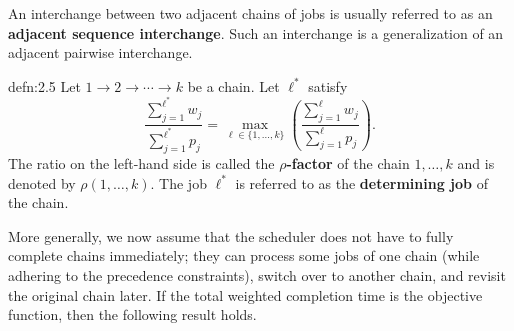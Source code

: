 An interchange between two adjacent chains of jobs is usually referred to as
an {\bf adjacent sequence interchange}. Such an interchange is a generalization of
an adjacent pairwise interchange.

\begin{defn}{defn:2.5}
    Let $1 \to 2 \to \cdots \to k$ be a chain. Let $\ell^*$ satisfy 
    \[ \frac{\sum_{j=1}^{\ell^*} w_j}{\sum_{j=1}^{\ell^*} p_j} 
    = \max_{\ell\in\{1, \dots, k\}} \left( \frac{\sum_{j=1}^\ell w_j}
    {\sum_{j=1}^\ell p_j} \right). \] 
    The ratio on the left-hand side is called the {\bf $\rho$-factor} 
    of the chain $1, \dots, k$ and is denoted by $\rho(1, \dots, k)$. 
    The job $\ell^*$ is referred to as the {\bf determining job} of the chain.
\end{defn}

More generally, we now assume that the scheduler does not have to fully 
complete chains immediately; they can process some jobs of one chain 
(while adhering to the precedence constraints), switch over to another 
chain, and revisit the original chain later. If the total weighted 
completion time is the objective function, then the following result holds. 

